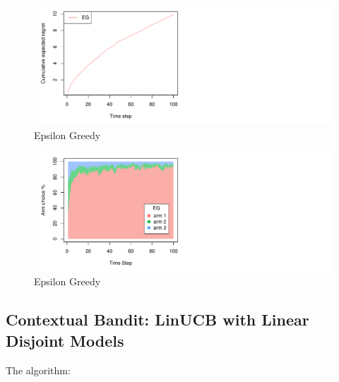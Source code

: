 \documentclass[nojss]{jss}\usepackage[]{graphicx}\usepackage[]{color}
\makeatletter
\def\maxwidth{ %
  \ifdim\Gin@nat@width>\linewidth
    \linewidth
  \else
    \Gin@nat@width
  \fi
}
\newenvironment{knitrout}{}{} %
\makeatother
\begin{document}
\begin{center}
\begin{knitrout}
\color{fgcolor}\begin{figure}[H]
\includegraphics[width=\maxwidth,]{fig/fig2-1} \caption[Epsilon Greedy]{Epsilon Greedy}\label{fig:fig21}
\end{figure}

\begin{figure}[H]
\includegraphics[width=\maxwidth,]{fig/fig2-2} \caption[Epsilon Greedy]{Epsilon Greedy}\label{fig:fig22}
\end{figure}


\end{knitrout}
\end{center}

\subsection{Contextual Bandit: LinUCB with Linear Disjoint Models}

The algorithm:
\end{document}
